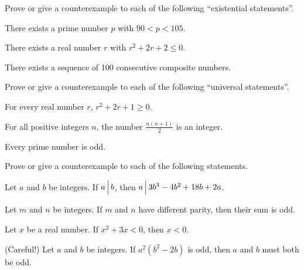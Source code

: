 
%

% 

%
\thispagestyle{fancy}

\begin{enumerate}
  \Problem Prove or give a counterexample to each of the following
  ``existential statements''. 
  \begin{enumerate}
    \Part  There exists a prime number $p$ with $90<p<105$. 
    \vfill

    \Part There exists a real number $r$ with $r^2+2r+2\le 0$.
    \vfill

    \Part There exists a sequence of 100 consecutive composite numbers.
    \vfill
  \end{enumerate}

  \Problem Prove or give a counterexample to each of the following
  ``universal statements''.
  \begin{enumerate}
    \Part For every real number $r$, $r^2 + 2r+1\ge0$. 
    \vfill

    \Part For all positive integers $n$, the number $\frac{n(n+1)}{2}$ is an integer.
    \vfill

    \Part Every prime number is odd.
    \vfill
  \end{enumerate}

\end{enumerate}
\newpage

Prove or give a counterexample to each of the following statements.
\begin{enumerate}
  \Problem Let $a$ and $b$ be integers. If $a\,\Big{|}\,b$, then
  $a\,\Big{|}\,3b^3-4b^2+18b+2a$.  
  \vfill

  \Problem Let $m$ and $n$ be integers.  If $m$ and $n$ have different
  parity, then their sum is odd.  
  \vfill

  \Problem Let $x$ be a real number.  If $x^2+3x<0$, then $x<0$.
  \vfill

  \Problem (Careful!) Let $a$ and $b$ be integers.  If $a^2(b^2-2b)$
  is odd, then $a$ and $b$ must both be odd.

  \vfill
\end{enumerate}


